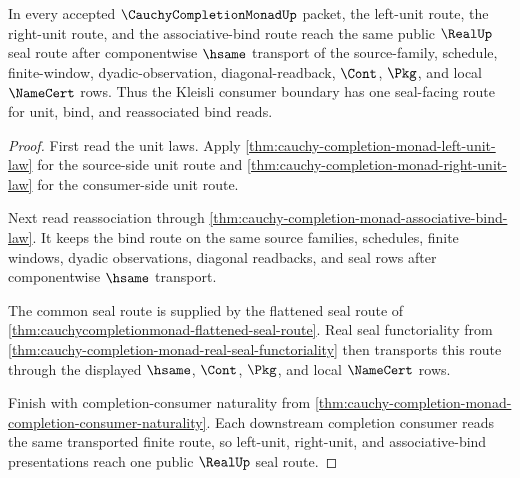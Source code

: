 \begin{theorem}
\label{thm:cauchy-completion-monad-kleisli-seal-coherence}
In every accepted $\CauchyCompletionMonadUp$ packet, the left-unit route, the right-unit route, and the associative-bind route reach the same public $\RealUp$ seal route after componentwise $\hsame$ transport of the source-family, schedule, finite-window, dyadic-observation, diagonal-readback, $\Cont$, $\Pkg$, and local $\NameCert$ rows. Thus the Kleisli consumer boundary has one seal-facing route for unit, bind, and reassociated bind reads.
\end{theorem}
\begin{proof}
First read the unit laws. Apply \autoref{thm:cauchy-completion-monad-left-unit-law} for the source-side unit route and \autoref{thm:cauchy-completion-monad-right-unit-law} for the consumer-side unit route.

Next read reassociation through \autoref{thm:cauchy-completion-monad-associative-bind-law}. It keeps the bind route on the same source families, schedules, finite windows, dyadic observations, diagonal readbacks, and seal rows after componentwise $\hsame$ transport.

The common seal route is supplied by the flattened seal route of \autoref{thm:cauchycompletionmonad-flattened-seal-route}. Real seal functoriality from \autoref{thm:cauchy-completion-monad-real-seal-functoriality} then transports this route through the displayed $\hsame$, $\Cont$, $\Pkg$, and local $\NameCert$ rows.

Finish with completion-consumer naturality from \autoref{thm:cauchy-completion-monad-completion-consumer-naturality}. Each downstream completion consumer reads the same transported finite route, so left-unit, right-unit, and associative-bind presentations reach one public $\RealUp$ seal route.
\end{proof}

